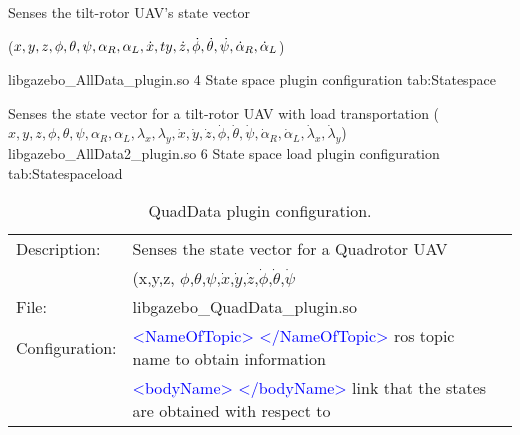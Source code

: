 \begin{plugintable}
	{Senses the tilt-rotor UAV's state vector\par($x,y,z,\phi,\theta,\psi,\alpha_R,\alpha_L,\dot x,\do ty,\dot z,\dot\phi,\dot\theta,\dot\psi,\dot\alpha_R,\dot\alpha_L$)}
	{libgazebo\_AllData\_plugin.so}
	{4}
	{State space plugin configuration}
	{tab:Statespace}
\end{plugintable}

\begin{plugintable}
	{Senses the state vector for a tilt-rotor UAV with load transportation ($x,y,z,\phi,\theta,\psi,\alpha_R,\alpha_L,\lambda_x,\lambda_y,\dot x,\dot y,\dot z,\dot\phi,\dot\theta,\dot\psi,\dot\alpha_R,\dot\alpha_L,\dot\lambda_x,\dot\lambda_y$)}
	{libgazebo\_AllData2\_plugin.so}
	{6}
	{State space load plugin configuration}
	{tab:Statespaceload}
\end{plugintable}


\begin{table}[h]
	\centering
	\begin{tabular}{|r|lr|}
		\hline
		\multicolumn{1}{|l|}{Description: } 
		
		& Senses the state vector for a Quadrotor UAV &         \\
		&
		(x,y,z, $\phi$,$\theta$,$\psi$,$\dot{x}$,$\dot{y}$,$\dot{z}$,$\dot{\phi}$,$\dot{\theta}$,$\dot{\psi}$   &  \\
		\hline
		\multicolumn{1}{|l|}{File: } & libgazebo\_QuadData\_plugin.so &          \\
		\hline
		\multicolumn{1}{|l|}{Configuration: } & \textcolor{blue}{<NameOfTopic> </NameOfTopic>} ros topic name to obtain information &         \\
		& \textcolor{blue}{<bodyName> </bodyName>} link that the states are obtained with respect to &         \\
		\hline
	\end{tabular}%
	\caption{QuadData plugin configuration.}
	\label{tab:QuadData}%
\end{table}%



